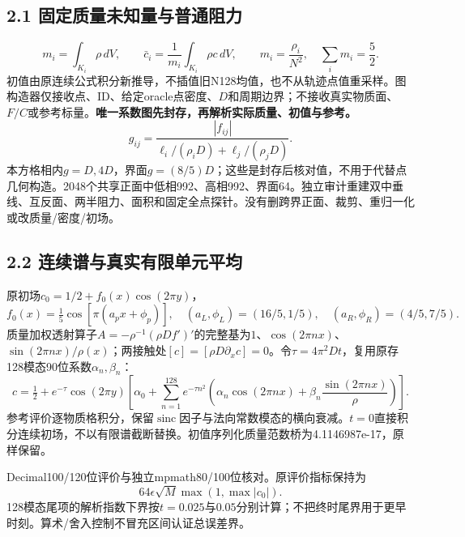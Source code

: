\documentclass[11pt,a4paper]{article}
\begin{document}
\subsection*{2.1 固定质量未知量与普通阻力}
\[
m_i=\int_{K_i}\rho\,dV,\qquad \bar c_i=\frac1{m_i}\int_{K_i}\rho c\,dV,
\qquad m_i=\frac{\rho_i}{N^2},\quad\sum_i m_i=\frac52.
\]
初值由原连续公式积分新推导，不插值旧N128均值，也不从轨迹点值重采样。图构造器仅接收点、ID、给定oracle点密度、$D$和周期边界；不接收真实物质面、$F/C$或参考标量。\textbf{唯一系数图先封存，再解析实际质量、初值与参考。}
\[
g_{ij}=\frac{|f_{ij}|}{\ell_i/(\rho_iD)+\ell_j/(\rho_jD)}.
\]
本方格相内$g=D,4D$，界面$g=(8/5)D$；这些是封存后核对值，不用于代替点几何构造。2048个共享正面中低相992、高相992、界面64。独立审计重建双中垂线、互反面、两半阻力、面积和固定全点探针。没有删跨界正面、裁剪、重归一化或改质量/密度/初场。

\subsection*{2.2 连续谱与真实有限单元平均}
原初场$c_0=1/2+f_0(x)\cos(2\pi y)$，
\[
f_0(x)=\tfrac15\cos[\pi(a_px+\phi_p)],\quad
(a_L,\phi_L)=(16/5,1/5),\quad(a_R,\phi_R)=(4/5,7/5).
\]
质量加权透射算子$A=-\rho^{-1}(\rho D f')'$的完整基为$1$、$\cos(2\pi nx)$、$\sin(2\pi nx)/\rho(x)$；两接触处$[c]=[\rho D\partial_xc]=0$。令$\tau=4\pi^2Dt$，复用原存128模态90位系数$\alpha_n,\beta_n$：
\[
c=\tfrac12+e^{-\tau}\cos(2\pi y)
\left[\alpha_0+\sum_{n=1}^{128}e^{-\tau n^2}
\left(\alpha_n\cos(2\pi nx)+\beta_n\frac{\sin(2\pi nx)}{\rho}\right)\right].
\]
参考评价逐物质格积分，保留$\operatorname{sinc}$因子与法向常数模态的横向衰减。$t=0$直接积分连续初场，不以有限谱截断替换。初值序列化质量范数桥为4.1146987e-17，原样保留。

Decimal100/120位评价与独立mpmath80/100位核对。原评价指标保持为\[64\epsilon\sqrt M\max(1,\max|c_0|).\]128模态尾项的解析指数下界按$t=0.025$与$0.05$分别计算；不把终时尾界用于更早时刻。算术/舍入控制不冒充区间认证总误差界。
\newpage
\end{document}
